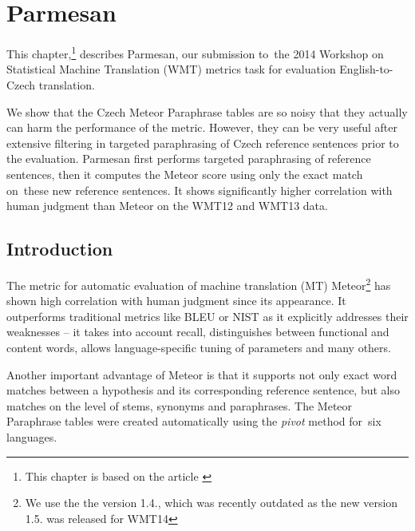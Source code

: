 \chapter{Parmesan}
\label{parmesan}

This chapter,\footnote{This chapter is based on the article \citep{parmesan:2014}}  describes Parmesan, our submission to~the 2014 Workshop on Statistical
Machine Translation (WMT) metrics task for evaluation English-to-Czech translation. 



We show that the Czech Meteor Paraphrase tables are so noisy that they actually can harm 
the performance of the metric. However, they can be very useful after extensive filtering 
in targeted paraphrasing of Czech reference sentences prior to the evaluation.
Parmesan first performs targeted paraphrasing of reference sentences, then it computes 
the Meteor score using only the exact match on~these new reference sentences. It shows 
significantly higher correlation with human judgment than Meteor on the WMT12 and WMT13 data. 

\section{Introduction}

The metric for automatic evaluation of machine translation (MT) Meteor\footnote{We use the 
the version 1.4., which was recently outdated as the new version 1.5. was released for WMT14} 
\cite{meteor-wmt:2011} has shown high correlation with human judgment since its appearance. It 
outperforms traditional metrics like BLEU \cite{bleu} or NIST \cite{nist} as it explicitly addresses 
their weaknesses -- it takes into account recall, distinguishes between functional and content words, 
allows language-specific tuning of parameters and many others.

Another important advantage of Meteor is that it supports not only exact word matches between a 
hypothesis and its corresponding reference sentence, but also matches on the level of stems,
synonyms and paraphrases. The Meteor Paraphrase tables \cite{meteor-tables} were created
automatically using the \textit{pivot} method \cite{pivoting} for~six languages.

